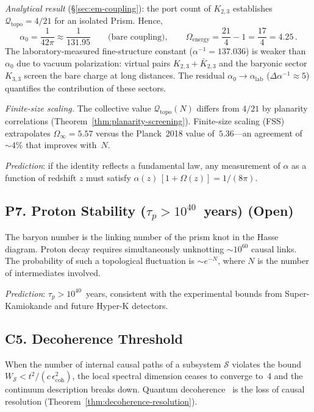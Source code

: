 \medskip\noindent
\textit{Analytical result}
(\S\ref{sec:em-coupling}): the port count of $K_{2,3}$
establishes $\mathcal{Q}_{\mathrm{topo}} = 4/21$ for an isolated Prism.
Hence,
\[
  \alpha_0 = \frac{1}{42\pi} \approx \frac{1}{131{.}95}
  \qquad\text{(bare coupling)},
  \qquad
  \Omega_{\mathrm{energy}} = \frac{21}{4} - 1 = \frac{17}{4} = 4{.}25\,.
\]
The laboratory-measured fine-structure constant
($\alpha^{-1} = 137{.}036$) is weaker than $\alpha_0$ due to
vacuum polarization: virtual pairs $K_{2,3} +
\bar{K}_{2,3}$ and the baryonic sector $K_{3,3}$ screen the bare
charge at long distances. The residual $\alpha_0 \to \alpha_{\text{lab}}$
($\Delta\alpha^{-1} \approx 5$) quantifies the contribution of these
sectors.

\medskip\noindent
\textit{Finite-size scaling.}\enspace
The collective value $\mathcal{Q}_{\mathrm{topo}}(N)$ differs from $4/21$
by planarity correlations (Theorem~\ref{thm:planarity-screening}).
Finite-size scaling (FSS) extrapolates
$\Omega_\infty = 5{.}57$ versus the Planck~2018 value
of~$5{.}36$---an agreement of $\sim\!4\%$ that improves with~$N$.

\medskip\noindent
\textit{Prediction}: if the identity reflects a fundamental law,
any measurement of $\alpha$ as a function of redshift
$z$ must satisfy $\alpha(z)\,[1 + \Omega(z)] = 1/(8\pi)$.

\subsection*{P7. Proton Stability
  ($\tau_p > 10^{40}$~years) (Open)}
\label{open:proton-stability}

The baryon number is the linking number
of the prism knot in the Hasse diagram. Proton decay
requires simultaneously unknotting $\sim\!10^{60}$ causal
links. The probability of such a topological fluctuation is
$\sim e^{-N}$, where $N$ is the number of intermediates
involved.

\medskip\noindent
\textit{Prediction}: $\tau_p > 10^{40}$~years, consistent with
the experimental bounds from Super-Kamiokande and future
Hyper-K detectors.

\subsection*{C5. Decoherence Threshold}
\label{conj:decoherence-threshold}

When the number of internal causal paths of a subsystem
$\mathcal{S}$ violates the bound $W_{\mathcal{S}} < t^2 /
(c\,\epsilon_{\text{coh}}^2)$, the local spectral dimension
ceases to converge to~4 and the continuum description breaks down.
Quantum decoherence~\cite{zurek2003} is the loss of
causal resolution (Theorem~\ref{thm:decoherence-resolution}).

